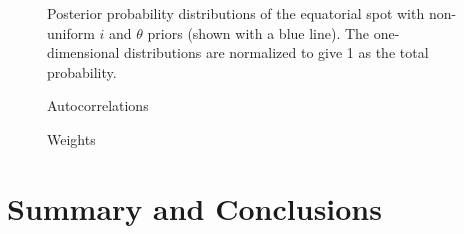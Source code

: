 \documentclass{wihuri}
\begin{document}
\begin{figure}
\centerline{}
\caption{Posterior probability distributions of the equatorial spot with non-uniform $i$ and $\theta$ priors (shown with a blue line). The one-dimensional distributions are normalized to give 1 as the total probability.
\label{fig:eqpostpr}}
\end{figure}


\begin{figure}
\centerline{}
\caption{Autocorrelations
\label{fig:acexample}}
\end{figure}


\begin{figure}
\centerline{}
\caption{Weights
\label{fig:wexample}}
\end{figure}



\section{Summary and Conclusions}










\iffalse
\begin{figure}
\begin{center}
\setlength{\unitlength}{1cm}
\begin{picture}(6,6)(-3,-3)
\put(-1.5,0){\vector(1,0){3}}
\put(2.7,-0.1){$\chi$}
\put(0,-1.5){\vector(0,1){3}}
\multiput(-2.5,1)(0.4,0){13}
{\line(1,0){0.2}}
\multiput(-2.5,-1)(0.4,0){13}
{\line(1,0){0.2}}
\put(0.2,1.4)
{$\beta=v/c=\tanh\chi$}
\qbezier(0,0)(0.8853,0.8853)
(2,0.9640)
\qbezier(0,0)(-0.8853,-0.8853)
(-2,-0.9640)
\end{picture}
\caption{Tässä on hieno kuva}
\label{kuva1}
\end{center}
\end{figure}
\fi


\end{document}
